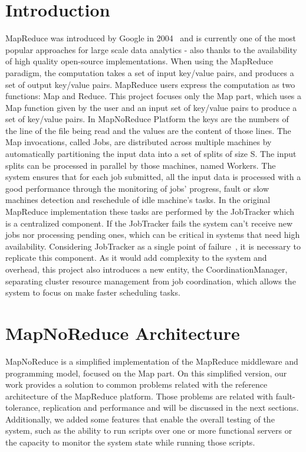 \documentclass[times, 10pt,twocolumn]{article}
\begin{document}
	\section{Introduction}
	MapReduce was introduced by Google in 2004~\cite{GhemawatMR2008} and is currently one of the most popular approaches for large scale data analytics - also thanks to the availability of high quality open-source implementations. When using the MapReduce paradigm, the computation takes a set of input key/value pairs, and produces a set of output key/value pairs. MapReduce users express the computation as two functions: Map and Reduce. 
	This project focuses only the Map part, which uses a Map function given by the user and an input set of key/value pairs to produce a set of key/value pairs. 
	In MapNoReduce Platform the keys are the numbers of the line of the file being read and the values are the content of those lines.
    The Map invocations, called Jobs, are distributed across multiple machines by automatically partitioning the input data into a set of splits of size S. The input splits can be processed in parallel by those machines, named Workers. The system ensures that for each job submitted, all the input data is processed with a good performance through the monitoring of jobs' progress, fault or slow machines detection and reschedule of idle machine's tasks.
	In the original MapReduce implementation these tasks are performed by the JobTracker which is a centralized component. If the JobTracker fails the system can't receive new jobs nor processing pending ones, which can be critical in systems that need high availability.
	Considering JobTracker as a single point of failure~\cite{Kalavri2013}, it is necessary to replicate this component. As it would add complexity to the system and overhead, this project also introduces a new entity, the CoordinationManager, separating cluster resource management from job coordination, which allows the system to focus on make faster scheduling tasks.  
	
	\section{MapNoReduce Architecture}
		
        MapNoReduce is a simplified implementation of the MapReduce middleware and programming model, focused on the Map part. On this simplified version, our work provides a solution to common problems related with the reference architecture of the MapReduce platform. Those problems are related with fault-tolerance, replication and performance and will be discussed in the next sections. Additionally, we added some features that enable the overall testing of the system, such as the ability to run scripts over one or more functional servers or the capacity to monitor the system state while running those scripts.
        
\end{document}

